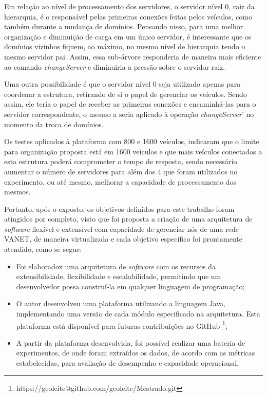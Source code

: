 \documentclass[
	12pt,				%
	oneside,			%
	a4paper,			%
	english,			%
	brazil				%
	]{abntex2ppgsi}
\begin{document}
Em relação ao nível de processamento dos servidores, o servidor nível 0, raiz da hierarquia, é o responsável pelas primeiras conexões feitas pelos veículos, como também durante a mudança de domínios. Pensando nisso, para uma melhor organização e diminuição de carga em um único servidor, é interessante que os domínios vizinhos fiquem, ao máximo, no mesmo nível de hierarquia tendo o mesmo servidor pai. Assim, essa sub-árvore responderia de maneira mais eficiente ao comando \textit{changeServer} e diminuiria a pressão sobre o servidor raiz.

Uma outra possibilidade é que o servidor nível 0 seja utilizado apenas para coordenar a estrutura, retirando de si o papel de gerenciar os veículos. Sendo assim, ele teria o papel de receber as primeiras conexões  e encaminhá-las para o servidor correspondente, o mesmo a seria aplicado à operação \textit{changeServer}' no momento da troca de domínios.

Os testes aplicados à plataforma com 800 e 1600 veículos, indicaram que o limite para organização proposta está em 1600 veículos e que mais veículos conectados a esta estrutura poderá comprometer o tempo de resposta, sendo necessário aumentar o número de servidores para além dos 4 que foram utilizados no experimento, ou até mesmo, melhorar a capacidade de processamento dos mesmos. 


Portanto, após o exposto, os objetivos definidos para este trabalho foram atingidos por completo, visto que foi proposta a criação de uma arquitetura de \textit{software} flexível e extensível com capacidade de gerenciar nós de uma rede VANET, de maneira virtualizada e cada objetivo específico foi prontamente atendido, como se segue: 

\begin{itemize}
	\item{Foi elaboradox uma arquitetura de \textit{software} com os recursos da extensibilidade, flexibilidade e escalabilidade, permitindo que um desenvolvedor possa construí-la em qualquer linguagem de programação;}	
	\item{O autor desenvolveu uma plataforma utilizando a linguagem Java, implementando uma versão de cada módulo especificado na arquitetura. Esta plataforma está disponível para futuras contribuições no GitHub \footnote{https://geoleite@github.com/geoleite/Mestrado.git};}	
	\item{A partir da plataforma desenvolvida, foi possível realizar uma bateria de experimentos, de onde foram extraídos os dados, de acordo com as métricas estabelecidas, para avaliação de desempenho e capacidade operacional.}	
\end{itemize} 
\end{document}
